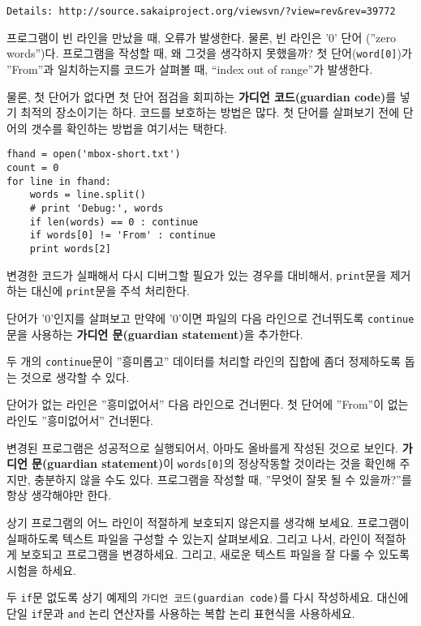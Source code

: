 \begin{enumerate}
\begin{verbatim}
Details: http://source.sakaiproject.org/viewsvn/?view=rev&rev=39772
\end{verbatim}
\afterverb
%

프로그램이 빈 라인을 만났을 때, 오류가 발생한다. 물론, 빈 라인은 '0' 단어 (''zero words'')다.
프로그램을 작성할 때, 왜 그것을 생각하지 못했을까?
첫 단어(\verb"word[0]")가 ''From''과 일치하는지를 코드가 살펴볼 때, ``index out of range''가 발생한다.

물론, 첫 단어가 없다면 첫 단어 점검을 회피하는 {\bf 가디언 코드(guardian code)}를 넣기 최적의 장소이기는 하다.
코드를 보호하는 방법은 많다. 첫 단어를 살펴보기 전에 단어의 갯수를 확인하는 방법을 여기서는 택한다.

\beforeverb
\begin{verbatim}
fhand = open('mbox-short.txt')
count = 0
for line in fhand:
    words = line.split()
    # print 'Debug:', words
    if len(words) == 0 : continue
    if words[0] != 'From' : continue
    print words[2]
\end{verbatim}
\afterverb
%

변경한 코드가 실패해서 다시 디버그할 필요가 있는 경우를 대비해서, {\tt print}문을 제거하는 대신에
{\tt print}문을 주석 처리한다.

단어가 '0'인지를 살펴보고 만약에 '0'이면 파일의 다음 라인으로 건너뛰도록 {\tt continue}문을 사용하는 {\bf 가디언 문(guardian statement)}을 추가한다.

두 개의 {\tt continue}문이 ''흥미롭고'' 데이터를 처리할 라인의 집합에 좀더 정제하도록 돕는 것으로 생각할 수 있다.

단어가 없는 라인은 ''흥미없어서'' 다음 라인으로 건너뛴다. 첫 단어에 ''From''이 없는 라인도 ''흥미없어서'' 건너뛴다.

변경된 프로그램은 성공적으로 실행되어서, 아마도 올바를게 작성된 것으로 보인다. 
{\bf 가디언 문(guardian statement)}이 {\tt words[0]}의 정상작동할 것이라는 것을 확인해 주지만, 충분하지 않을 수도 있다.
프로그램을 작성할 때, ''무엇이 잘못 될 수 있을까?''를 항상 생각해야만 한다.


\begin{ex}
상기 프로그램의 어느 라인이 적절하게 보호되지 않은지를 생각해 보세요.
프로그램이 실패하도록 텍스트 파일을 구성할 수 있는지 살펴보세요.
그리고 나서, 라인이 적절하게 보호되고 프로그램을 변경하세요.
그리고, 새로운 텍스트 파일을 잘 다룰 수 있도록 시험을 하세요.

\end{ex}

\begin{ex}
두 {\tt if}문 없도록 상기 예제의 {\tt 가디언 코드(guardian code)}를 다시 작성하세요.
대신에 단일 {\tt if}문과 {\tt and} 논리 연산자를 사용하는 복합 논리 표현식을 사용하세요.
\end{ex}


\end{enumerate}



